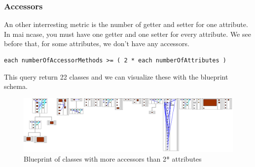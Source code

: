 \subsubsection{Accessors}
An other interresting metric is the number of getter and setter for one attribute.  In mai ncase, you must have one getter and one setter for every attribute.  We see before that, for some attributes, we don't have any accessors. \\
\begin{lstlisting}
each numberOfAccessorMethods >= ( 2 * each numberOfAttributes ) 
\end{lstlisting}
This query return 22 classes and we can visualize these with the blueprint schema.\\
\begin{figure}[ht]
\centering
\label{more_access_blueprint}
\includegraphics[scale=0.35]{more_access_blueprint.png}
\caption{Blueprint of classes with more accessors than 2* attributes}
\end{figure}






